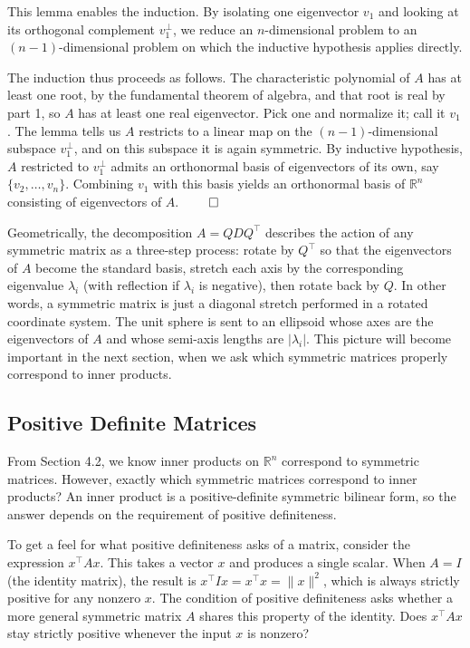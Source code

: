 \documentclass{article}
\begin{document}
This lemma enables the induction. By isolating one eigenvector $v_1$ and looking at its orthogonal complement $v_1^\perp$, we reduce an $n$-dimensional problem to an $(n - 1)$-dimensional problem on which the inductive hypothesis applies directly. 

The induction thus proceeds as follows. The characteristic polynomial of $A$ has at least one root, by the fundamental theorem of algebra, and that root is real by part 1, so $A$ has at least one real eigenvector. Pick one and normalize it; call it $v_1$. The lemma tells us $A$ restricts to a linear map on the $(n-1)$-dimensional subspace $v_1^\perp$, and on this subspace it is again symmetric. By inductive hypothesis, $A$ restricted to $v_1^\perp$ admits an orthonormal basis of eigenvectors of its own, say $\{v_2, \dots, v_n\}$. Combining $v_1$ with this basis yields an orthonormal basis of $\mathbb{R}^n$ consisting of eigenvectors of $A$. $\qed$
 
Geometrically, the decomposition $A = QDQ^\top$ describes the action of any symmetric matrix as a three-step process: rotate by $Q^\top$ so that the eigenvectors of $A$ become the standard basis, stretch each axis by the corresponding eigenvalue $\lambda_i$ (with reflection if $\lambda_i$ is negative), then rotate back by $Q$. In other words, a symmetric matrix is just a diagonal stretch performed in a rotated coordinate system. The unit sphere is sent to an ellipsoid whose axes are the eigenvectors of $A$ and whose semi-axis lengths are $|\lambda_i|$. This picture will become important in the next section, when we ask which symmetric matrices properly correspond to inner products.
 
 
\subsection{Positive Definite Matrices}
From Section 4.2, we know inner products on $\mathbb{R}^n$ correspond to symmetric matrices. However, exactly which symmetric matrices correspond to inner products? An inner product is a positive-definite symmetric bilinear form, so the answer depends on the requirement of positive definiteness.
 
To get a feel for what positive definiteness asks of a matrix, consider the expression $x^\top A x$. This takes a vector $x$ and produces a single scalar. When $A = I$ (the identity matrix), the result is $x^\top I x = x^\top x = \|x\|^2$, which is always strictly positive for any nonzero $x$. The condition of positive definiteness asks whether a more general symmetric matrix $A$ shares this property of the identity. Does $x^\top A x$ stay strictly positive whenever the input $x$ is nonzero?
 
\end{document}
